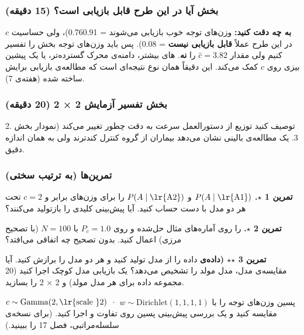 \subsubsection{\texorpdfstring{بخش  آیا  در این طرح قابل
بازیابی است؟ (15
دقیقه)}{بخش C: آیا GCM در این طرح قابل بازیابی است؟ (15 دقیقه)}}

\textbf{به چه دقت کنید:} وزن‌های توجه خوب بازیابی می‌شوند  =
0.76\lr{--}0.91)، ولی حساسیت \(c\) در این طرح عملاً \textbf{قابل بازیابی نیست}
 = 0.08). پس باید وزن‌های توجه بخش  را تفسیر کنیم ولی مقدار
\(\hat c = 3.82\) را \textbf{نه}. های بیشتر، دامنه‌ی محرک
گسترده‌تر، یا یک پیشین بیزی روی \(c\) کمک می‌کند. این دقیقاً همان نوع
نتیجه‌ای است که مطالعه‌ی بازیابی برایش ساخته شده (هفته‌ی 7).

\subsubsection{\texorpdfstring{بخش  تفسیر آزمایش 2 × 2 (20
دقیقه)}{بخش E: تفسیر آزمایش 2 × 2 (20 دقیقه)}}

2. توصیف کنید توزیع  از دستورالعمل سرعت به دقت چطور تغییر می‌کند
(نمودار بخش  3. یک مطالعه‌ی بالینی نشان می‌دهد بیماران از گروه
کنترل کندترند ولی به همان اندازه دقیق.

\subsubsection{تمرین‌ها (به ترتیب سختی)}

\textbf{تمرین 1 \ensuremath{\star}.} \(P(A\mid\text{\lr{A1}})\) و \(P(A\mid\text{\lr{A2}})\) را
برای وزن‌های برابر و \(c = 2\) تحت هر دو مدل با دست حساب کنید. آیا
پیش‌بینی کلیدی را بازتولید می‌کنند؟

\textbf{تمرین 2 \ensuremath{\star}.}  را روی آماره‌های مثال حل‌شده و روی
\(P_c = 1.0\) با \(N = 100\)  (با تصحیح مرزی) اعمال کنید. بدون
تصحیح چه اتفاقی می‌افتد؟

\textbf{تمرین 3 \ensuremath{\star}\ensuremath{\star} (داده‌ی } داده را از مدل
\textbf{} تولید کنید و هر دو مدل را برازش کنید. آیا
مقایسه‌ی مدل، مدل مولد را تشخیص می‌دهد؟ یک بازیابی مدل کوچک اجرا کنید (20
مجموعه داده برای هر مدل مولد) و  2 × 2 را بسازید.

\(c \sim \mathrm{Gamma}(2, \text{\lr{scale }} 2)\) ·
\(w \sim \mathrm{Dirichlet}(1,\allowbreak 1,\allowbreak 1,\allowbreak 1)\) پسین وزن‌های توجه را با
 مقایسه کنید و یک بررسی پیش‌بینی پسین روی تفاوت  و 
اجرا کنید. (برای نسخه‌ی سلسله‌مراتبی،  \lr{\&}  فصل 17
را ببینید.)

